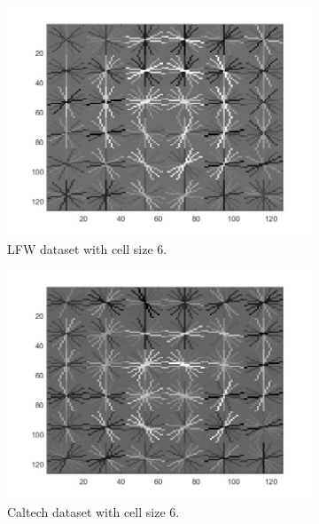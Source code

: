 \documentclass{article}
\begin{document}
\begin{figure}[!htb]
\begin{subfigure}{.40\textwidth}
  \centering
  \includegraphics[width=.99\textwidth]{hogs_6_lfw.jpg}
\caption{LFW dataset with cell size 6.}
\end{subfigure}
\begin{subfigure}{.40\textwidth}
  \centering
  \includegraphics[width=.99\textwidth]{hogs_6.jpg}
\caption{Caltech dataset with cell size 6.}
\end{subfigure}
\begin{subfigure}{.44\textwidth}
  \centering

\end{subfigure}
\end{figure}
\end{document}
